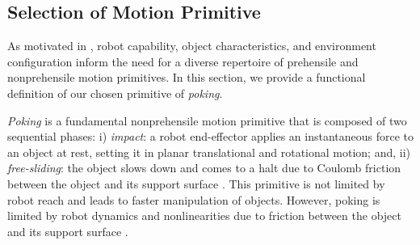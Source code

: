 \subsection{Selection of Motion Primitive}\label{sec:methods-selection}

As motivated in , robot capability, object characteristics, and environment configuration inform the need for a diverse repertoire of prehensile and nonprehensile motion primitives.
In this section, we provide a functional definition of our chosen primitive of \textsl{poking}.

\textsl{Poking} is a fundamental nonprehensile motion primitive that is composed of two sequential phases: i) \textsl{impact}: a robot end-effector applies an instantaneous force to an object at rest, setting it in planar translational and rotational motion; and, ii) \textsl{free-sliding}: the object slows down and comes to a halt due to Coulomb friction between the object and its support surface \cite{pasricha2022pokerrt}. This primitive is not limited by robot reach and leads to faster manipulation of objects. However, poking is limited by robot dynamics and nonlinearities due to friction between the object and its support surface .

